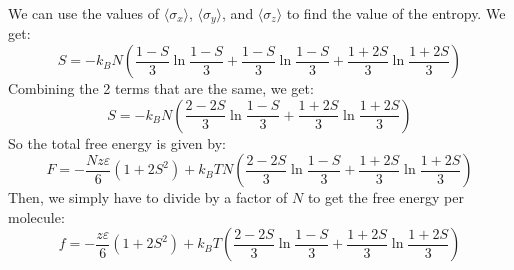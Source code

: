 \documentclass[12pt]{article}
\begin{document}
We can use the values of $\langle \sigma_x \rangle$, $\langle \sigma_y \rangle$, and $\langle \sigma_z \rangle$ to find the value of the entropy. We get:
\begin{equation}
S = -k_B N \left(\frac{1 - S}{3} \ln \frac{1 - S}{3} + \frac{1 - S}{3} \ln \frac{1 - S}{3} + \frac{1 + 2S}{3} \ln \frac{1 + 2S}{3}\right)
\end{equation}
Combining the 2 terms that are the same, we get:
\begin{equation}
S = -k_B N \left(\frac{2 - 2S}{3} \ln \frac{1 - S}{3} + \frac{1 + 2S}{3} \ln \frac{1 + 2S}{3}\right)
\end{equation}
So the total free energy is given by:
\begin{equation}
F = -\frac{Nz\varepsilon}{6} (1 + 2S^2) + k_B T N \left(\frac{2 - 2S}{3} \ln \frac{1 - S}{3} + \frac{1 + 2S}{3} \ln \frac{1 + 2S}{3}\right)
\end{equation}
Then, we simply have to divide by a factor of $N$ to get the free energy per molecule:
\begin{equation}
f = -\frac{z\varepsilon}{6} (1 + 2S^2) + k_B T \left(\frac{2 - 2S}{3} \ln \frac{1 - S}{3} + \frac{1 + 2S}{3} \ln \frac{1 + 2S}{3}\right)
\end{equation}
\end{document}
